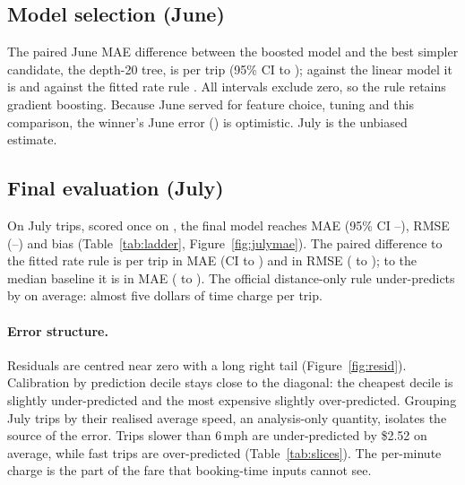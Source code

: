 \documentclass[11pt,a4paper]{article}
\newcommand{\POSNUM}[1]{#1}\newcommand{\NEGNUM}[1]{\textminus#1}
\newcommand{\usd}[1]{\$#1}%
\newcommand{\money}[1]{{\renewcommand{\POSNUM}[1]{\$##1}\renewcommand{\NEGNUM}[1]{\textminus\$##1}#1}}%
\begin{document}
\subsection{Model selection (June)}
\TableSelection
The paired June MAE difference between the boosted model and the best simpler candidate, the depth-20 tree, is \money{\SelTreeMaePoint} per trip (95\% CI \money{\SelTreeMaeLo} to \money{\SelTreeMaeHi}); against the linear model it is \money{\SelLinearMaePoint} and against the fitted rate rule \money{\SelRuleMaePoint}. All intervals exclude zero, so the rule retains gradient boosting. Because June served for feature choice, tuning and this comparison, the winner's June error (\money{\JuneFinalMae}) is optimistic. July is the unbiased estimate.

\subsection{Final evaluation (July)}
\TableLadder
On \JulyN{} July trips, scored once on \JulyScoredAt, the final model reaches MAE \money{\JulyFinalMae} (95\% CI \money{\JulyVsMedianMaemodelLo}--\money{\JulyVsMedianMaemodelHi}), RMSE \money{\JulyFinalRmse} (\money{\JulyVsMedianRmsemodelLo}--\money{\JulyVsMedianRmsemodelHi}) and bias \money{\JulyFinalBias} (Table~\ref{tab:ladder}, Figure~\ref{fig:julymae}). The paired difference to the fitted rate rule is \money{\JulyVsRuleMaediffPoint} per trip in MAE (CI \money{\JulyVsRuleMaediffLo} to \money{\JulyVsRuleMaediffHi}) and \money{\JulyVsRuleRmsediffPoint} in RMSE (\money{\JulyVsRuleRmsediffLo} to \money{\JulyVsRuleRmsediffHi}); to the median baseline it is \money{\JulyVsMedianMaediffPoint} in MAE (\money{\JulyVsMedianMaediffLo} to \money{\JulyVsMedianMaediffHi}). The official distance-only rule under-predicts by \money{\JulyTlcBias} on average: almost five dollars of time charge per trip.

\paragraph{Error structure.} Residuals are centred near zero with a long right tail (Figure~\ref{fig:resid}). Calibration by prediction decile stays close to the diagonal: the cheapest decile is slightly under-predicted and the most expensive slightly over-predicted. Grouping July trips by their realised average speed, an analysis-only quantity, isolates the source of the error. Trips slower than 6\,mph are under-predicted by \usd{2.52} on average, while fast trips are over-predicted (Table~\ref{tab:slices}). The per-minute charge is the part of the fare that booking-time inputs cannot see.
\end{document}

